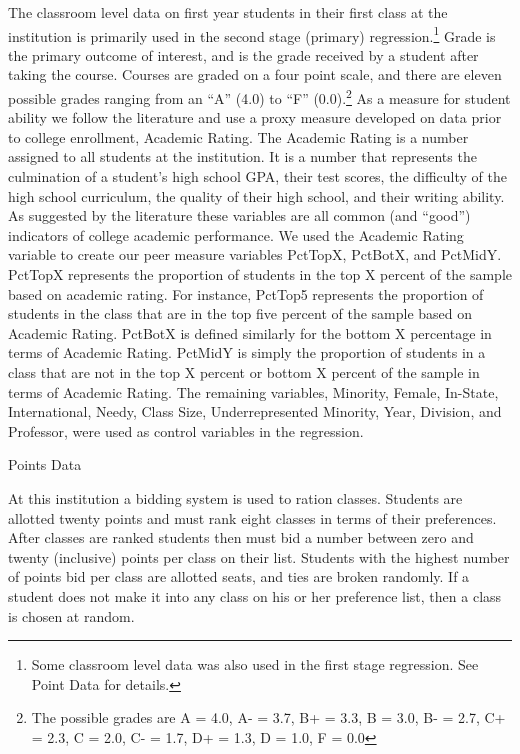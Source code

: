\documentclass[12pt,a4paper,english,fleqn]{article}
\makeatletter
\renewcommand\subsection{\@startsection{subsection}{2}
{\z@}{-3.25ex\@plus -1ex \@minus -.2ex}{1.5ex \@plus .2ex}{\normalfont\bf}}
\makeatother
\begin{document}
The classroom level data on first year students in their first class at the institution is primarily used in the second stage (primary) regression.\footnote{Some classroom level data was also used in the first stage regression. See Point Data for details.} Grade is the primary outcome of interest, and is the grade received by a student after taking the course. Courses are graded on a four point scale, and there are eleven possible grades ranging from an ``A'' (4.0) to ``F'' (0.0).\footnote{The possible grades are A = 4.0, A- = 3.7, B+ = 3.3, B = 3.0, B- = 2.7, C+ = 2.3, C = 2.0, C- = 1.7, D+ = 1.3, D = 1.0, F = 0.0} As a measure for student ability we follow the literature and use a proxy measure developed on data prior to college enrollment, Academic Rating. The Academic Rating is a number assigned to all students at the institution. It is a number that represents the culmination of a student's high school GPA, their test scores, the difficulty of the high school curriculum, the quality of their high school, and their writing ability. As suggested by the literature these variables are all common (and ``good'') indicators of college academic performance. We used the Academic Rating variable to create our peer measure variables PctTopX, PctBotX, and PctMidY. PctTopX represents the proportion of students in the top X percent of the sample based on academic rating. For instance, PctTop5 represents the proportion of students in the class that are in the top five percent of the sample based on Academic Rating. PctBotX is defined similarly for the bottom X percentage in terms of Academic Rating. PctMidY is simply the proportion of students in a class that are not in the top X percent or bottom X percent of the sample in terms of Academic Rating. The remaining variables, Minority, Female, In-State, International, Needy, Class Size, Underrepresented Minority, Year, Division, and Professor, were used as control variables in the regression. 

\subsection{Points Data}

At this institution a bidding system is used to ration classes. Students are allotted twenty points and must rank eight classes in terms of their preferences. After classes are ranked students then must bid a number between zero and twenty (inclusive) points per class on their list. Students with the highest number of points bid per class are allotted seats, and ties are broken randomly. If a student does not make it into any class on his or her preference list, then a class is chosen at random. 
\end{document}
